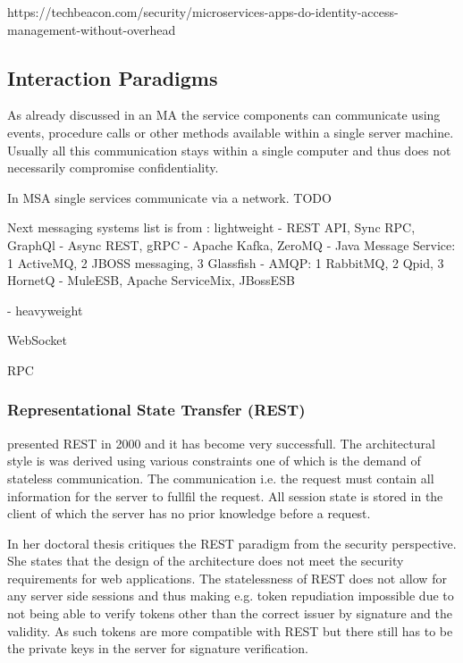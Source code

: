 https://techbeacon.com/security/microservices-apps-do-identity-access-management-without-overhead



\subsection{Interaction Paradigms}
\begin{sloppypar}
    As already discussed in an MA the service components can communicate using 
    events, procedure calls or other methods available within a single server 
    machine. Usually all this communication stays within a single computer and 
    thus does not necessarily compromise confidentiality.
\end{sloppypar}
\begin{sloppypar}
    In MSA single services communicate via a network.
    TODO

    Next messaging systems list is from \citep{secchalmsa}:
lightweight
-
    REST API,
    Sync RPC,
    GraphQl
    -
    Async REST,
    gRPC
    - 
    Apache Kafka,
    ZeroMQ
    -
    Java Message Service:
    1 ActiveMQ,
    2 JBOSS messaging,
    3 Glassfish
    -
    AMQP:
    1 RabbitMQ,
    2 Qpid,
    3 HornetQ
    -
    MuleESB,
    Apache ServiceMix,
    JBossESB


-
heavyweight

    WebSocket
    



\end{sloppypar}

RPC


\subsubsection{Representational State Transfer (REST)}
\begin{sloppypar}
    \citet{restroy} presented REST in 2000 and it has become very successfull. 
    The architectural style is was derived using various constraints one of 
    which is the demand of stateless communication. The communication i.e. 
    the request must contain all information for the server to fullfil the request. 
    All session state is stored in the client of which the server has no prior 
    knowledge before a request.
\end{sloppypar}
\begin{sloppypar}
    In her doctoral thesis \citet{secchalmsa} critiques the REST paradigm from 
    the security perspective. She states that the design of the architecture 
    does not meet the security requirements for web applications. The 
    statelessness of REST does not allow for any server side sessions and thus 
    making e.g. token repudiation impossible due to not being able to verify 
    tokens other than the correct issuer by signature and the validity. As such 
    tokens are more compatible with REST but there still has to be the private 
    keys in the server for signature verification.
\end{sloppypar}




